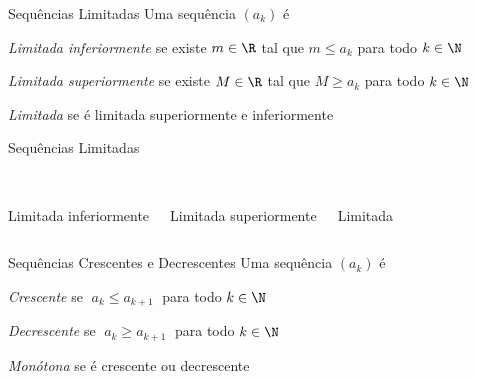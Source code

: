 \begin{frame}{Sequências Limitadas}
	Uma sequência $(a_k)$ é

	\pause
  \vspace{\baselineskip}
	\emph{Limitada inferiormente} \tabto{50mm} se existe $m\in\R$ tal que \emph{$m\leq a_k$} para todo $k\in\N$

	\pause
	\vspace{\baselineskip}
	\emph{Limitada superiormente} \tabto{50mm} se existe $M\in\R$ tal que \emph{$M\geq a_k$} para todo $k\in\N$

	\pause
	\vspace{\baselineskip}
	\emph{Limitada}               \tabto{50mm} se é limitada superiormente e inferiormente

\end{frame}

\begin{frame}{Sequências Limitadas}
\begin{columns}
  \begin{center}
    \scalebox{0.9}{} \\[5mm]
    Limitada inferiormente
  \end{center}
  \pause
  \begin{center}
    \scalebox{0.9}{} \\[5mm]
    Limitada superiormente
  \end{center}
  \pause
  \begin{center}
    \scalebox{0.9}{} \\[5mm]
    Limitada
  \end{center}
\end{columns}
\end{frame}

\begin{frame}{Sequências Crescentes e Decrescentes}
	Uma sequência $(a_k)$ é

	\vspace{\baselineskip}
	\emph{Crescente}   \tabto{30mm} se \emph{$\;a_k \leq a_{k+1}\;$} para todo $k\in\N$

	\pause
	\vspace{\baselineskip}
	\emph{Decrescente} \tabto{30mm} se \emph{$\;a_k \geq a_{k+1}\;$} para todo $k\in\N$

	\pause
	\vspace{\baselineskip}
	\emph{Monótona}    \tabto{30mm} se é crescente ou decrescente
\end{frame}


